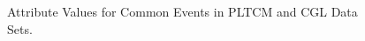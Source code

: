  \begin{figure}[!ht]
	\begin{center}
		\caption{Attribute Values for Common Events in PLTCM and CGL Data Sets.}
		\label{figure-data-cleaning-CGL}
	\end{center}
\end{figure}